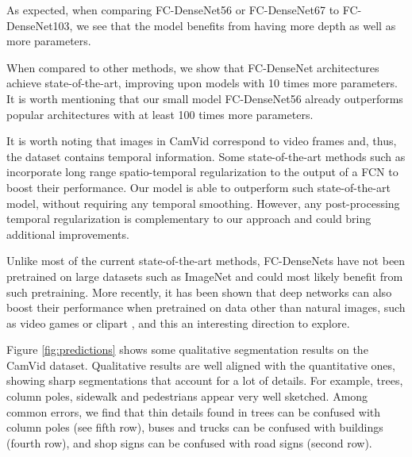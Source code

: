 \documentclass[10pt,twocolumn,letterpaper]{article}
\begin{document}
As expected, when comparing FC-DenseNet56 or FC-DenseNet67 to FC-DenseNet103, we see that the model benefits from having more depth as well as more parameters. 

When compared to other methods, we show that FC-DenseNet architectures achieve state-of-the-art, improving upon models with 10 times more parameters. It is worth mentioning that our small model FC-DenseNet56 already outperforms popular architectures with at least 100 times more parameters. 

It is worth noting that images in CamVid correspond to video frames and, thus, the dataset contains temporal information. Some state-of-the-art methods such as \cite{KunduCVPR16} incorporate long range spatio-temporal regularization to the output of a FCN to boost their performance. Our model is able to outperform such state-of-the-art model, without requiring any temporal smoothing. However, any post-processing temporal regularization is complementary to our approach and could bring additional improvements.

Unlike most of the current state-of-the-art methods, FC-DenseNets have not been pretrained on large datasets such as ImageNet \cite{imagenet_cvpr09} and could most likely benefit from such pretraining. More recently, it has been shown that deep networks can also boost their performance when pretrained on data other than natural images, such as video games \cite{Richter_2016_ECCV,Ros_2016_CVPR} or clipart \cite{CastrejonAVPT16}, and this an interesting direction to explore.

Figure \ref{fig:predictions} shows some qualitative segmentation results on the CamVid dataset. Qualitative results are well aligned with the quantitative ones, showing sharp segmentations that account for a lot of details. For example, trees, column poles, sidewalk and pedestrians appear very well sketched. Among common errors, we find that thin details found in trees can be confused with column poles (see fifth row), buses and trucks can be confused with buildings (fourth row), and shop signs can be confused with road signs (second row).  
\end{document}
